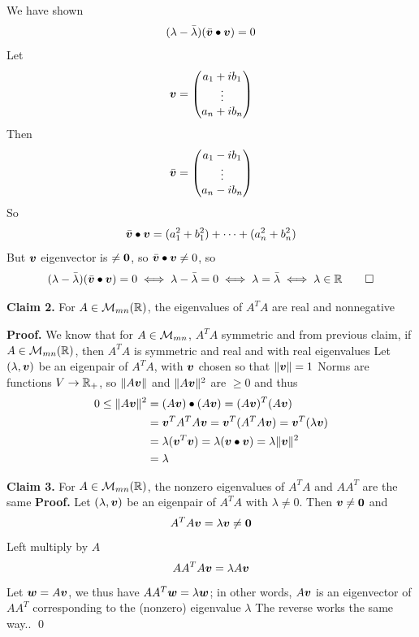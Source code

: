 \documentclass[aspectratio=169]{beamer}\usepackage[]{graphicx}\usepackage[]{xcolor}
\begin{document}
\begin{frame}
We have shown
\[
(\lambda-\bar\lambda)(\bar{\bm{v}}\bullet\bm{v}) = 0
\]
Let 
\[
\bm{v} = \begin{pmatrix}
a_1+ib_1 \\
\vdots \\
a_n+ib_n
\end{pmatrix}
\]
Then
\[
\bar{\bm{v}} = \begin{pmatrix}
a_1-ib_1 \\
\vdots \\
a_n-ib_n
\end{pmatrix}
\]
So
\[
\bar{\bm{v}}\bullet\bm{v} = (a_1^2+b_1^2)+\cdots+(a_n^2+b_n^2)
\]
But $\bm{v}$ eigenvector is $\neq\b0$, so $\bar{\bm{v}}\bullet\bm{v}\neq 0$, so
\[
(\lambda-\bar\lambda)(\bar{\bm{v}}\bullet\bm{v}) = 0
\iff \lambda-\bar\lambda=0
\iff \lambda=\bar\lambda\iff \lambda\in\mathbb{R}\qed
\]
\end{frame}


\begin{frame}[red]
\textbf{Claim 2.} For $A\in\mathcal{M}_{mn}(\mathbb{R})$, the eigenvalues of $A^TA$ are real and nonnegative

\vfill
\textbf{Proof.}
We know that for $A\in\mathcal{M}_{mn}$, $A^TA$ symmetric and from previous claim, if $A\in\mathcal{M}_{mn}(\mathbb{R})$, then $A^TA$ is symmetric and real and with real eigenvalues
\vfill
Let $(\lambda,\bm{v})$ be an eigenpair of $A^TA$, with $\bm{v}$ chosen so that $\|\bm{v}\|=1$
\vfill 
Norms are functions $V\to\mathbb{R}_+$, so $\|A\bm{v}\|$ and $\|A\bm{v}\|^2$ are $\geq 0$ and thus
\begin{align*}
0\leq \|A\bv\|^2 &= (A\bv)\bullet(A\bv) = (A\bv)^T(A\bv) \\
&= \bv^TA^TA\bv = \bv^T(A^TA\bv) = \bv^T(\lambda\bv) \\
&= \lambda(\bv^T\bv) = \lambda(\bv\bullet\bv) = \lambda\|\bv\|^2 \\
&= \lambda\hfill\qedhere
\end{align*}
\end{frame}

\begin{frame}
\textbf{Claim 3.} For $A\in\mathcal{M}_{mn}(\mathbb{R})$, the nonzero eigenvalues of $A^TA$ and $AA^T$ are the same
\vfill
\textbf{Proof.}
Let $(\lambda,\bm{v})$ be an eigenpair of $A^TA$ with $\lambda\neq 0$. Then $\bv\neq\b0$ and
\[
	A^TA\bv=\lambda\bv\neq\b0
\]
Left multiply by $A$
\[
	AA^TA\bm{v} = \lambda A\bm{v}
\]
Let $\bm{w}=A\bm{v}$, we thus have $AA^T\bm{w}=\lambda\bm{w}$; in other words, $A\bm{v}$ is an eigenvector of $AA^T$ corresponding to the (nonzero) eigenvalue $\lambda$
\vfill
The reverse works the same way.. \qed
\end{frame}
\end{document}
